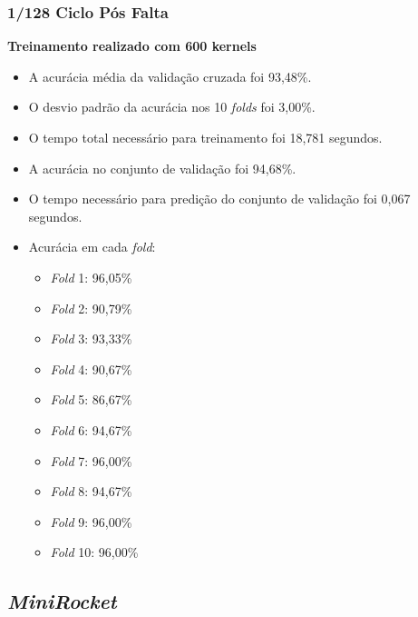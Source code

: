 \subsubsection{1/128 Ciclo Pós Falta}
\textbf{Treinamento realizado com 600 kernels}
\begin{itemize}
    \item A acurácia média da validação cruzada foi 93,48\%.
    \item O desvio padrão da acurácia nos 10 \textit{folds} foi 3,00\%.
    \item O tempo total necessário para treinamento foi 18,781 segundos.
    \item A acurácia no conjunto de validação foi 94,68\%.
    \item O tempo necessário para predição do conjunto de validação foi 0,067 segundos.
    \item Acurácia em cada \textit{fold}:
    \begin{itemize}
        \item \textit{Fold} 1: 96,05\%
        \item \textit{Fold} 2: 90,79\%
        \item \textit{Fold} 3: 93,33\%
        \item \textit{Fold} 4: 90,67\%
        \item \textit{Fold} 5: 86,67\%
        \item \textit{Fold} 6: 94,67\%
        \item \textit{Fold} 7: 96,00\%
        \item \textit{Fold} 8: 94,67\%
        \item \textit{Fold} 9: 96,00\%
        \item \textit{Fold} 10: 96,00\%
    \end{itemize}
\end{itemize}


\subsection{\textit{MiniRocket}}
